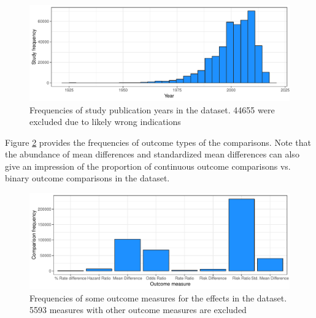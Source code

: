 \documentclass[11pt,a4paper,twoside]{book}\usepackage[]{graphicx}\usepackage[]{color}
\newenvironment{knitrout}{}{} %
\begin{document}
\begin{figure}
\begin{knitrout}
\color{fgcolor}

{\centering \includegraphics[width=\textwidth-3cm]{figure/ch02_figunnamed-chunk-8-1} 

}



\end{knitrout}
\caption{Frequencies of study publication years in the dataset. 44655 were excluded due to likely wrong indications}
\label{study.years}
\end{figure}

Figure \ref{study.outcomes} provides the frequencies of outcome types of the comparisons. Note that the abundance of mean differences and standardized mean differences can also give an impression of the proportion of continuous outcome comparisons vs. binary outcome comparisons in the dataset.

\begin{figure}
\begin{knitrout}
\color{fgcolor}

{\centering \includegraphics[width=\textwidth-3cm]{figure/ch02_figunnamed-chunk-9-1} 

}



\end{knitrout}
\caption{Frequencies of some outcome measures for the effects in the dataset. 5593 measures with other outcome measures are excluded}
\label{study.outcomes}
\end{figure}
\end{document}
